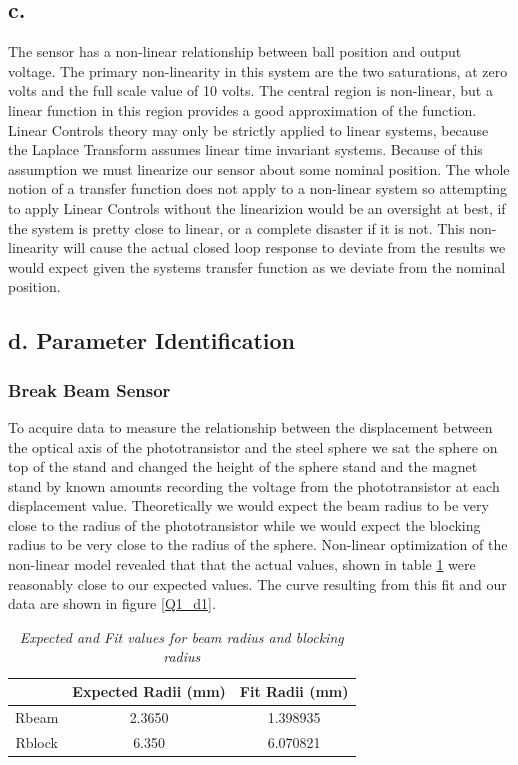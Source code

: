 \documentclass{article}
\theoremstyle{plain}
\theoremstyle{definition}
\theoremstyle{remark}
\begin{document}
\subsection*{c.}
The sensor has a non-linear relationship between ball position and output voltage.  The primary non-linearity in this system are the two saturations, at zero volts and the full scale value of 10 volts.  The central region is non-linear, but a linear function in this region provides a good approximation of the function.  Linear Controls theory may only be strictly applied to linear systems, because the Laplace Transform assumes linear time invariant systems.  Because of this assumption we must linearize our sensor about some nominal position.  The whole notion of a transfer function does not apply to a non-linear system so attempting to apply Linear Controls without the linearizion would be an oversight at best, if the system is pretty close to linear, or a complete disaster if it is not.  This non-linearity will cause the actual closed loop response to deviate from the results we would expect given the systems transfer function as we deviate from the nominal position.

\subsection*{d. Parameter Identification}

\subsubsection*{Break Beam Sensor}
To acquire data to measure the relationship between the displacement between the optical axis of the phototransistor and the steel sphere we sat the sphere on top of the stand and changed the height of the sphere stand and the magnet stand by known amounts recording the voltage from the phototransistor at each displacement value.  Theoretically we would expect the beam radius to be very close to the radius of the phototransistor while we would expect the blocking radius to be very close to the radius of the sphere.  Non-linear optimization of the non-linear model revealed that that the actual values, shown in table \ref{Q1_dt2} were reasonably close to our expected values.  The curve resulting from this fit and our data are shown in figure \ref{Q1_d1}.

\begin{table}
\begin{center}
    \begin{tabular}{|c|c|c|}
        \hline
        ~      & Expected Radii (mm) & Fit Radii (mm) \\ \hline
        Rbeam  & 2.3650              & 1.398935       \\ 
        Rblock & 6.350               & 6.070821       \\
        \hline
    \end{tabular}
\label{Q1_dt2}
\caption{\emph{Expected and Fit values for beam radius and blocking radius}}
\end{center}
\end{table}
\end{document}
